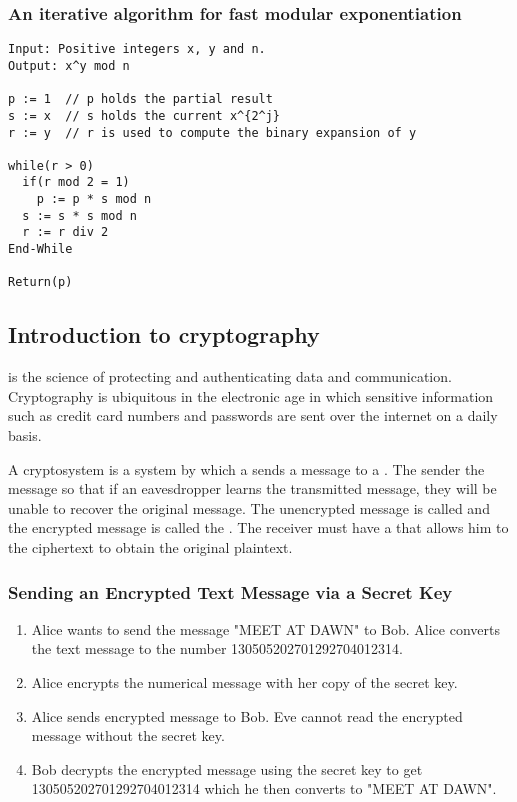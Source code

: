 \subsubsection*{An iterative algorithm for fast modular exponentiation}
\begin{lstlisting}
Input: Positive integers x, y and n.
Output: x^y mod n

p := 1  // p holds the partial result
s := x  // s holds the current x^{2^j}
r := y  // r is used to compute the binary expansion of y

while(r > 0)
  if(r mod 2 = 1)
    p := p * s mod n
  s := s * s mod n
  r := r div 2
End-While

Return(p)
\end{lstlisting}

\subsection{Introduction to cryptography}
 is the science of protecting and authenticating data and communication. Cryptography is ubiquitous in the electronic age in which sensitive information such as credit card numbers and passwords are sent over the internet on a daily basis.

A cryptosystem is a system by which a  sends a message to a . The sender  the message so that if an eavesdropper learns the transmitted message, they will be unable to recover the original message. The unencrypted message is called  and the encrypted message is called the . The receiver must have a  that allows him to  the ciphertext to obtain the original plaintext.

\subsubsection*{Sending an Encrypted Text Message via a Secret Key}
\begin{enumerate}
    \item Alice wants to send the message "MEET AT DAWN" to Bob. Alice converts the text message to the number 130505202701292704012314.
    \item Alice encrypts the numerical message with her copy of the secret key.
    \item Alice sends encrypted message to Bob. Eve cannot read the encrypted message without the secret key.
    \item Bob decrypts the encrypted message using the secret key to get 130505202701292704012314 which he then converts to "MEET AT DAWN".
\end{enumerate}

